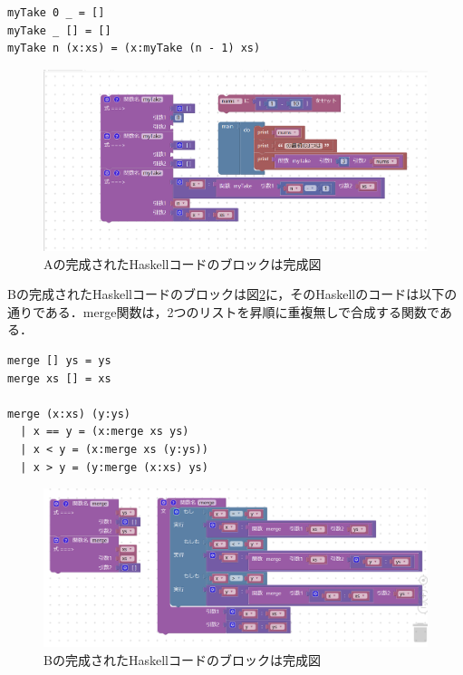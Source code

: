 \documentclass{risepaper}
\begin{document}
\begin{itemize}
\begin{lstlisting}[basicstyle=\ttfamily\footnotesize]
myTake 0 _ = []
myTake _ [] = []
myTake n (x:xs) = (x:myTake (n - 1) xs)
\end{lstlisting}

\begin{figure}[h]
\begin{center}
\includegraphics[scale=0.5]{img/haskell_experiment_result_a.PNG}
\caption{Aの完成されたHaskellコードのブロックは完成図}%
\label{fig:haskell_experiment_result_a}
\end{center}%
\end{figure}%

Bの完成されたHaskellコードのブロックは図\ref{fig:haskell_experiment_result_b}に，そのHaskellのコードは以下の通りである．merge関数は，2つのリストを昇順に重複無しで合成する関数である．
\begin{lstlisting}[basicstyle=\ttfamily\footnotesize]
merge [] ys = ys
merge xs [] = xs

merge (x:xs) (y:ys)
  | x == y = (x:merge xs ys)
  | x < y = (x:merge xs (y:ys))
  | x > y = (y:merge (x:xs) ys)
\end{lstlisting}

\begin{figure}[h]
\begin{center}
\includegraphics[scale=0.5]{img/haskell_experiment_result_b.PNG}
\caption{Bの完成されたHaskellコードのブロックは完成図}%
\label{fig:haskell_experiment_result_b}
\end{center}%
\end{figure}%

\end{itemize} 
\end{document}
